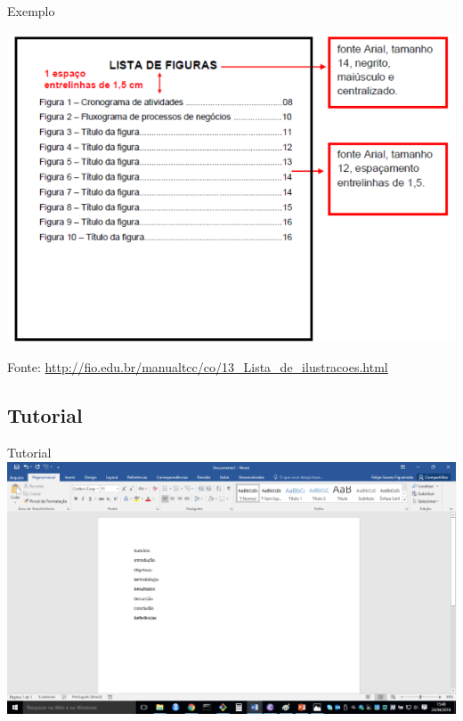 \documentclass{beamer}
\begin{document}
\begin{frame}{Exemplo}
  \begin{center}
    \includegraphics[height=0.8\textheight]{EstruturaII/lista_figuras}
  \end{center}

  Fonte: \url{http://fio.edu.br/manualtcc/co/13_Lista_de_ilustracoes.html}
\end{frame}

\subsection{Tutorial}

\begin{frame}{Tutorial}
  \includegraphics[height=0.9\textheight]{EstruturaII/sumario1}
\end{frame}
\end{document}
